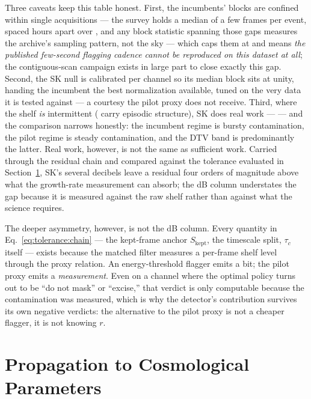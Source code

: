 Three caveats keep this table honest. First, the incumbents' blocks are confined within single acquisitions --- the survey holds a median of a few frames per event, spaced hours apart over , and any block statistic spanning those gaps measures the archive's sampling pattern, not the sky --- which caps them at  and means \emph{the published few-second flagging cadence cannot be reproduced on this dataset at all}; the contiguous-scan campaign exists in large part to close exactly this gap. Second, the SK null is calibrated per channel so its median block sits at unity, handing the incumbent the best normalization available, tuned on the very data it is tested against --- a courtesy the pilot proxy does not receive. Third, where the shelf \emph{is} intermittent ( carry episodic structure), SK does real work ---  --- and the comparison narrows honestly: the incumbent regime is bursty contamination, the pilot regime is steady contamination, and the DTV band is predominantly the latter. Real work, however, is not the same as sufficient work. Carried through the residual chain and compared against the tolerance evaluated in Section~\ref{sec:tolerance:fisher}, SK's several decibels leave a residual four orders of magnitude above what the growth-rate measurement can absorb; the dB column understates the gap because it is measured against the raw shelf rather than against what the science requires.

The deeper asymmetry, however, is not the dB column. Every quantity in Eq.~\eqref{eq:tolerance:chain} --- the kept-frame anchor $S_{\text{kept}}$, the timescale split, $\tau_c$ itself --- exists because the matched filter measures a per-frame shelf level through the proxy relation. An energy-threshold flagger emits a bit; the pilot proxy emits a \emph{measurement}. Even on a channel where the optimal policy turns out to be ``do not mask'' or ``excise,'' that verdict is only computable because the contamination was measured, which is why the detector's contribution survives its own negative verdicts: the alternative to the pilot proxy is not a cheaper flagger, it is not knowing $r$.

\section{Propagation to Cosmological Parameters}
\label{sec:tolerance:fisher}

